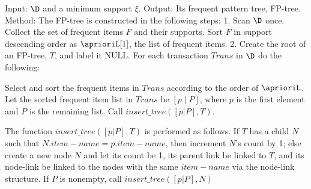 Input: $\D$ and a minimum support $\xi$.
Output: Its frequent pattern tree, FP-tree.
Method: The FP-tree is constructed in the following steps:
  1. Scan $\D$ once. Collect the set of frequent items $F$ and their supports.
     Sort $F$ in support descending order as $\aprioriL[1]$, the list of frequent items.
	2. Create the root of an FP-tree, $T$, and label it NULL. For each transaction 
     $Trans$ in $\D$ do the following:
		
     Select and sort the frequent items in $Trans$ according to the order of $\aprioriL$.
     Let the sorted frequent item list in $Trans$ be $[p\mid P]$, where $p$ is the first
     element and $P$ is the remaining list. Call $insert\_tree\left([p|P],T\right)$.
		
		 The function $insert\_tree\left([p|P],T\right)$ is performed as follows. If $T$ has a child
     $N$ such that $N.item-name = p.item-name$, then increment $N$'s count by 1;
     else create a new node $N$ and let its count be 1, its parent link be
     linked to $T$, and its node-link be linked to the nodes with the same
     $item-name$ via the node-link structure. If $P$ is nonempty, call
     $insert\_tree\left([p|P],N\right)$
